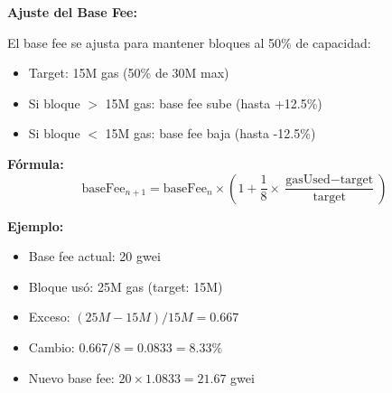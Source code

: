 \documentclass[11pt,a4paper,twoside,openright]{book}
\theoremstyle{definition}
\theoremstyle{plain}
\theoremstyle{remark}
\begin{document}
\begin{mathnote}
\textbf{Ajuste del Base Fee:}

El base fee se ajusta para mantener bloques al 50\% de capacidad:
\begin{itemize}
    \item Target: 15M gas (50\% de 30M max)
    \item Si bloque $>$ 15M gas: base fee sube (hasta +12.5\%)
    \item Si bloque $<$ 15M gas: base fee baja (hasta -12.5\%)
\end{itemize}

\textbf{Fórmula:}
\[ \text{baseFee}_{n+1} = \text{baseFee}_n \times \left(1 + \frac{1}{8} \times \frac{\text{gasUsed} - \text{target}}{\text{target}}\right) \]

\textbf{Ejemplo:}
\begin{itemize}
    \item Base fee actual: 20 gwei
    \item Bloque usó: 25M gas (target: 15M)
    \item Exceso: $(25M - 15M) / 15M = 0.667$
    \item Cambio: $0.667 / 8 = 0.0833 = 8.33\%$
    \item Nuevo base fee: $20 \times 1.0833 = 21.67$ gwei
\end{itemize}
\end{mathnote}

\begin{center}
\end{center}
\end{document}
